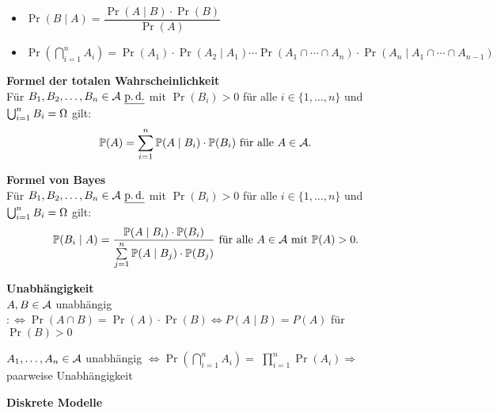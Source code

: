 \begin{itemize}
\item $\Pr(B \mid A) = \dfrac{\Pr(A \mid B) \cdot \Pr(B)}{\Pr(A)}$
\item $\Pr(\bigcap_{i=1}^{n} A_i) = \Pr(A_1) \cdot \Pr(A_2 \mid A_1) \cdots
  \Pr(A_1 \cap \cdots \cap A_n) \cdot \Pr(A_n \mid A_1 \cap \cdots \cap A_{n-1})$
\end{itemize}

\textbf{Formel der totalen Wahrscheinlichkeit}\\
Für $B_1,B_2,\ldots,B_n\in\mathcal{A}\ \underline{\operatorname{p.d.}}$ mit $\Pr(B_i) > 0$ für alle
$i\in\{1,\ldots,n\}$ und $\bigcup_{i=1}^{n} B_i = \Omega$ gilt:
\[
  \mathbb{P}(A) = \sum_{i=1}^{n} \mathbb{P}(A \mid B_i) \cdot \mathbb{P}(B_i) \text{ für alle } A\in\mathcal{A}.
\]

\newpage

\textbf{Formel von Bayes}\\
Für $B_1,B_2,\ldots,B_n\in\mathcal{A}\ \underline{\operatorname{p.d.}}$ mit $\Pr(B_i) > 0$ für alle
$i\in\{1,\ldots,n\}$ und $\bigcup_{i=1}^{n} B_i = \Omega$ gilt:
\[
  \mathbb{P}(B_i \mid A)=
  \frac{\mathbb{P}(A \mid B_i) \cdot \mathbb{P}(B_i)}{\sum\limits_{j=1}^{n} \mathbb{P}(A \mid B_j)
  \cdot \mathbb{P}(B_j)} \text{ für alle } A\in\mathcal{A} \text{ mit } \mathbb{P}(A) > 0.
\]

\textbf{Unabhängigkeit}\\
$A,B\in\mathcal{A}$ unabhängig $:\Leftrightarrow \Pr(A \cap B) = \Pr(A) \cdot \Pr(B)
\Leftrightarrow P(A \mid B) = P(A)$ für $\Pr(B) > 0$

$A_1,\ldots,A_n\in\mathcal{A}$ unabhängig $\Leftrightarrow \Pr(\bigcap_{i=1}^{n} A_i) = $
$\prod_{i=1}^{n} \Pr(A_i) \Rightarrow $ paarweise Unabhängigkeit

\textbf{Diskrete Modelle}\\


